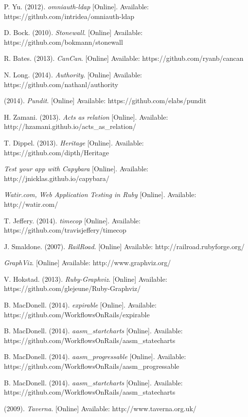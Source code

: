 \begin{thebibliography}{99}
P. Yu. (2012). \textit{omniauth-ldap} [Online]. Available: https://github.com/intridea/omniauth-ldap

D. Bock. (2010). \textit{Stonewall}. [Online] Available: https://github.com/bokmann/stonewall

R. Bates. (2013). \textit{CanCan}. [Online] Available: https://github.com/ryanb/cancan

N. Long. (2014). \textit{Authority}. [Online] Available: https://github.com/nathanl/authority

(2014). \textit{Pundit}. [Online] Available: https://github.com/elabs/pundit

H. Zamani. (2013). \textit{Acts as relation} [Online]. Available: http://hzamani.github.io/acts\_as\_relation/

T. Dippel. (2013). \textit{Heritage} [Online]. Available: https://github.com/dipth/Heritage

\textit{Test your app with Capybara} [Online]. Available: http://jnicklas.github.io/capybara/

\textit{Watir.com, Web Application Testing in Ruby} [Online]. Available: http://watir.com/

T. Jeffery. (2014). \textit{timecop} [Online]. Available: https://github.com/travisjeffery/timecop

J. Smaldone. (2007). \textit{RailRoad}. [Online] Available: http://railroad.rubyforge.org/

\textit{GraphViz}. [Online] Available: http://www.graphviz.org/

V. Hokstad. (2013). \textit{Ruby-Graphviz}. [Online] Available: https://github.com/glejeune/Ruby-Graphviz/

B. MacDonell. (2014). \textit{expirable} [Online]. Available: https://github.com/WorkflowsOnRails/expirable

B. MacDonell. (2014). \textit{aasm\_startcharts} [Online]. Available: https://github.com/WorkflowsOnRails/aasm\_statecharts

B. MacDonell. (2014). \textit{aasm\_progressable} [Online]. Available: https://github.com/WorkflowsOnRails/aasm\_progressable

B. MacDonell. (2014). \textit{aasm\_startcharts} [Online]. Available: https://github.com/WorkflowsOnRails/aasm\_statecharts

(2009). \textit{Taverna}. [Online] Available: http://www.taverna.org.uk/


\end{thebibliography}

%    
%    

